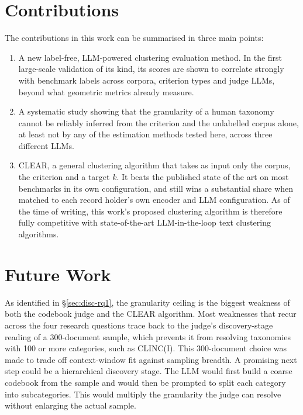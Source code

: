 \documentclass[11pt,a4paper,oneside]{report}
\begin{document}
\section{Contributions}

The contributions in this work can be summarised in three main points:
\begin{enumerate}
    \item A new label-free, LLM-powered clustering evaluation method. In the first large-scale validation of its kind, its scores are shown to correlate strongly
    with benchmark labels across corpora, criterion types and judge LLMs,
    beyond what geometric metrics already measure.
    \item A systematic study showing that the granularity of a human
    taxonomy cannot be reliably inferred from the criterion and the
    unlabelled corpus alone, at least not by any of the
    estimation methods tested here, across three different LLMs.
     \item CLEAR, a general clustering algorithm that takes as input only the corpus, the criterion and a target $k$. It beats the published state of the art on most benchmarks in its own configuration, and still wins a substantial share when matched to each record holder's own encoder and LLM configuration. As of the time of writing, this work's proposed clustering algorithm is therefore fully competitive with state-of-the-art LLM-in-the-loop text clustering algorithms.

\end{enumerate}

\section{Future Work}

As identified in \S\ref{sec:disc-rq1}, the granularity ceiling is the biggest weakness of both the codebook judge and the CLEAR algorithm. Most weaknesses that recur across the four research questions trace back to the judge's discovery-stage reading of a 300-document sample, which prevents it from resolving taxonomies with 100 or more categories, such as CLINC(I). This 300-document choice was made to trade off context-window fit against sampling breadth. A promising next step could be a hierarchical discovery stage. The LLM would
first build a coarse codebook from the sample and would then be prompted to split
each category into subcategories. This would multiply the granularity the judge can resolve
without enlarging the actual sample.
\end{document}
